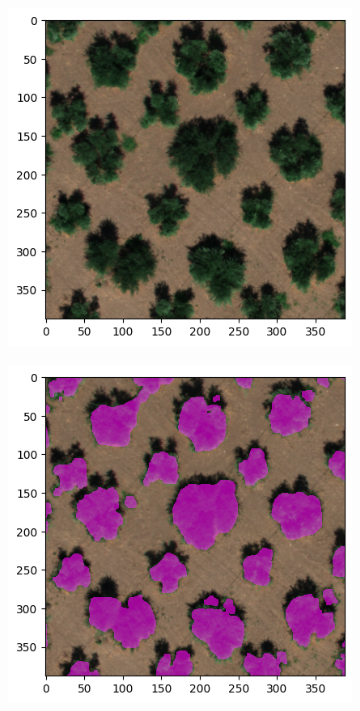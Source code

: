 \documentclass[comsoc,final]{IEEEtran}
\begin{document}
\begin{figure}
{\begin{subfigure}[b]{0.47\columnwidth}
         \caption{}
         \label{maskplot:b}
     \end{subfigure}}\hfill
%       
     \begin{subfigure}[b]{0.47\columnwidth}
         \centering
         \includegraphics[width=\columnwidth]{ulivo}
         \caption{}
         \label{maskplot:c}
     \end{subfigure}%
%
     \begin{subfigure}[b]{0.47\columnwidth}
         \centering
         \includegraphics[width=\columnwidth]{ulivo_GT}

\end{subfigure}
\end{figure}
\end{document}
